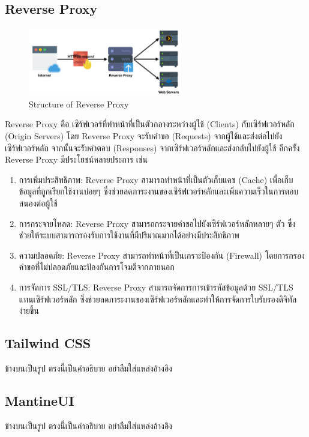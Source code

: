     \subsection{Reverse Proxy}
    \begin{figure}[!h]
      \centering
      \includegraphics[width=0.6\textwidth]{image/Background/Reverse-proxy.png}
      \caption[Reverse Proxy]{Structure of Reverse Proxy}
      \label{fig:reverse_proxy_pic}
    \end{figure}
    \qquad Reverse Proxy คือ เซิร์ฟเวอร์ที่ทำหน้าที่เป็นตัวกลางระหว่างผู้ใช้ (Clients) กับเซิร์ฟเวอร์หลัก (Origin Servers)
    โดย Reverse Proxy จะรับคำขอ (Requests) จากผู้ใช้และส่งต่อไปยังเซิร์ฟเวอร์หลัก จากนั้นจะรับคำตอบ (Responses)
    จากเซิร์ฟเวอร์หลักและส่งกลับไปยังผู้ใช้ อีกครั้ง Reverse Proxy มีประโยชน์หลายประการ เช่น \cite{ReverseProxy}
    \begin{enumerate}
      \item การเพิ่มประสิทธิภาพ: Reverse Proxy สามารถทำหน้าที่เป็นตัวเก็บแคช (Cache) เพื่อเก็บข้อมูลที่ถูกเรียกใช้งานบ่อยๆ
      ซึ่งช่วยลดภาระงานของเซิร์ฟเวอร์หลักและเพิ่มความเร็วในการตอบสนองต่อผู้ใช้
      \item การกระจายโหลด: Reverse Proxy สามารถกระจายคำขอไปยังเซิร์ฟเวอร์หลักหลายๆ ตัว
      ซึ่งช่วยให้ระบบสามารถรองรับการใช้งานที่มีปริมาณมากได้อย่างมีประสิทธิภาพ
      \item ความปลอดภัย: Reverse Proxy สามารถทำหน้าที่เป็นเกราะป้องกัน (Firewall)
      โดยการกรองคำขอที่ไม่ปลอดภัยและป้องกันการโจมตีจากภายนอก
      \item การจัดการ SSL/TLS: Reverse Proxy สามารถจัดการการเข้ารหัสข้อมูลด้วย SSL/TLS
      แทนเซิร์ฟเวอร์หลัก ซึ่งช่วยลดภาระงานของเซิร์ฟเวอร์หลักและทำให้การจัดการใบรับรองดิจิทัลง่ายขึ้น
    \end{enumerate}
    
  \subsection{Tailwind CSS}
    \qquad ข้างบนเป็นรูป ตรงนี้เป็นคำอธิบาย อย่าลืมใส่แหล่งอ้างอิง \cite{Tailwind}
  \subsection{MantineUI}
    \qquad ข้างบนเป็นรูป ตรงนี้เป็นคำอธิบาย อย่าลืมใส่แหล่งอ้างอิง \cite{Mantine}

